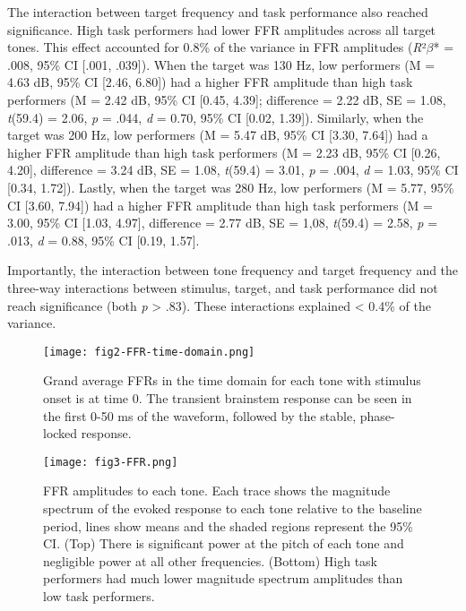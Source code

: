 \documentclass{article}
\begin{document}
The interaction between target frequency and task performance also reached significance. High task performers had lower FFR amplitudes across all target tones. This effect accounted for 0.8\% of the variance in FFR amplitudes (\textit{R}²$\beta$* = .008, 95\% CI [.001, .039]). When the target was 130 Hz, low performers (M = 4.63 dB, 95\% CI [2.46, 6.80]) had a higher FFR amplitude than high task performers (M = 2.42 dB, 95\% CI [0.45, 4.39]; difference = 2.22 dB, SE = 1.08, \textit{t}(59.4) = 2.06, \textit{p} = .044, \textit{d} = 0.70, 95\% CI [0.02, 1.39]). Similarly, when the target was 200 Hz, low performers (M = 5.47 dB, 95\% CI [3.30, 7.64]) had a higher FFR amplitude than high task performers (M = 2.23 dB, 95\% CI [0.26, 4.20], difference = 3.24 dB, SE = 1.08, \textit{t}(59.4) = 3.01, \textit{p} = .004, \textit{d} = 1.03, 95\% CI [0.34, 1.72]). Lastly, when the target was 280 Hz, low performers (M = 5.77, 95\% CI [3.60, 7.94]) had a higher FFR amplitude than high task performers (M = 3.00, 95\% CI [1.03, 4.97], difference = 2.77 dB, SE = 1,08, \textit{t}(59.4) = 2.58, \textit{p} = .013, \textit{d} = 0.88, 95\% CI [0.19, 1.57].

Importantly, the interaction between tone frequency and target frequency and the three-way interactions between stimulus, target, and task performance did not reach significance (both \textit{p} > .83). These interactions explained < 0.4\% of the variance. 


\begin{figure}
    \centering
    \texttt{[image: fig2-FFR-time-domain.png]}
    \caption{Grand average FFRs in the time domain for each tone with stimulus onset is at time 0. The transient brainstem response can be seen in the first 0-50 ms of the waveform, followed by the stable, phase-locked response. 
}
    \label{Figure 2}
\end{figure}

\begin{figure}
    \centering
    \texttt{[image: fig3-FFR.png]}
    \caption{FFR amplitudes to each tone. Each trace shows the magnitude spectrum of the evoked response to each tone relative to the baseline period, lines show means and the shaded regions represent the 95\% CI. (Top) There is significant power at the pitch of each tone and negligible power at all other frequencies. (Bottom) High task performers had much lower magnitude spectrum amplitudes than low task performers.
}
    \label{Figure 3}
\end{figure}
\end{document}
